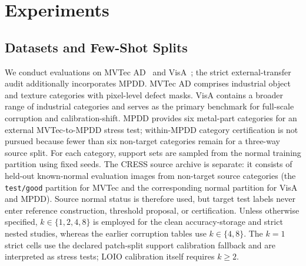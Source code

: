 \section{Experiments}\label{sec:experiments}
\subsection{Datasets and Few-Shot Splits}
We conduct evaluations on MVTec AD~\cite{mvtec2019} and VisA~\cite{visa2022}; the strict external-transfer audit additionally incorporates MPDD. MVTec AD comprises industrial object and texture categories with pixel-level defect masks. VisA contains a broader range of industrial categories and serves as the primary benchmark for full-scale corruption and calibration-shift. MPDD provides six metal-part categories for an external MVTec-to-MPDD stress test; within-MPDD category certification is not pursued because fewer than six non-target categories remain for a three-way source split. For each category, support sets are sampled from the normal training partition using fixed seeds. The CRESS source archive is separate: it consists of held-out known-normal evaluation images from non-target source categories (the \texttt{test/good} partition for MVTec and the corresponding normal partition for VisA and MPDD). Source normal status is therefore used, but target test labels never enter reference construction, threshold proposal, or certification. Unless otherwise specified, $k\in\{1,2,4,8\}$ is employed for the clean accuracy-storage and strict nested studies, whereas the earlier corruption tables use $k\in\{4,8\}$. The $k=1$ strict cells use the declared patch-split support calibration fallback and are interpreted as stress tests; LOIO calibration itself requires $k\geq2$.

